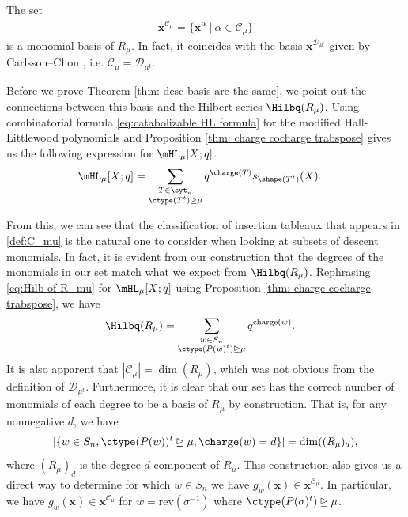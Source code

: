 \begin{thm1}
\makeatletter{}\makeatother
\label{thm: desc basis are the same} 
    The set 
    \begin{align}\label{eq: our basis}
        \mathbf{x}^{\mathcal{C}_\mu} = \{\mathbf{x}^\alpha \ | \ \alpha \in \mathcal{C}_\mu\}
    \end{align}
     is a monomial basis of $R_{\mu}$. 
       In fact, it coincides with the basis $  \mathbf{x}^{\mathcal{D}_{\mu^t}}$ given by Carlsson--Chou \cite{CC}, i.e. $\mathcal{C}_\mu = \mathcal{D}_{\mu^t}$.
\end{thm1}

Before we prove Theorem \ref{thm: desc basis are the same}, we point out the connections between this basis and the Hilbert series $\Hilbq(R_{\mu})$.
Using combinatorial formula \eqref{eq:catabolizable HL formula} for the modified Hall-Littlewood polynomials and Proposition \ref{thm: charge cocharge trabspose} gives us the following expression for $\mHL_{\mu}[X;q]$.
\begin{align}
    \mHL_{\mu} [X;q] &=  \sum\limits_{\substack{T\in \syt_n\\  \ctype(T^t)\unrhd\mu}}  q^{\charge(T)} s_{\shape(T^t)}(X).
\end{align}

From this, we can see that the classification of insertion tableaux that appears in \eqref{def:C_mu} is the natural one to consider when looking at subsets of descent monomials. 
In fact, it is evident from our construction that the degrees of the monomials in our set match what we expect from $\Hilbq(R_{\mu})$. 
Rephrasing \eqref{eq:Hilb of R_mu} for $\mHL_{\mu}[X;q]$ using Proposition \ref{thm: charge cocharge trabspose}, we have
\begin{align}
     \Hilbq(R_{\mu}) &=  \sum\limits_{\substack{w\in S_n\\  \ctype(P(w)^t)\unrhd\mu}}  q^{\text{charge}(w)} .
\end{align}
It is also apparent that $|\mathcal{C}_\mu| = \dim(R_{\mu})$, which was not obvious from the definition of $\mathcal{D}_{\mu^t}$.
Furthermore, it is clear that our set has the correct number of monomials of each degree to be a basis of $R_{\mu}$ by construction.
That is, for any nonnegative $d$, we have 
\[|\{w\in S_n, \ctype(P(w))^t \unrhd \mu, \charge(w) = d\}| = \dim((R_{\mu})_d),\]
where $(R_{\mu})_d$ is the degree $d$ component of $R_{\mu}$.
This construction also gives us a direct way to determine for which $w\in S_n$ we have $g_w(\mathbf{x})\in \mathbf{x}^{\mathcal{C}_\mu}$.
In particular, we have $g_w(\mathbf{x})\in \mathbf{x}^{\mathcal{C}_\mu}$ for $w = \text{rev}(\sigma^{-1})$ where $\ctype(P(\sigma)^t)\unrhd \mu$.


